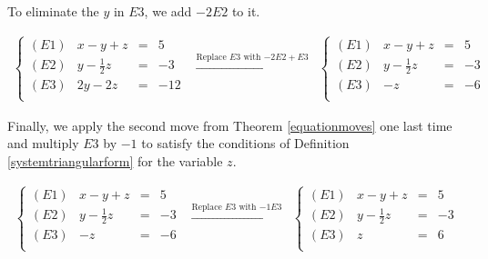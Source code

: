 \begin{ex}
\begin{enumerate}
To eliminate the $y$ in $E3$, we add $-2E2$ to it.

\[\begin{array}{ccc}

\left\{ 

\begin{array}{lrcr}

(E1) & x-y+z & = & 5 \\
(E2) & y - \frac{1}{2}z & = & -3\\
(E3) & 2y-2z & = & -12 \\

\end{array} 

\right.
&
\xrightarrow{\text{Replace $E3$ with $-2E2 + E3$}}

&

\left\{ 

\begin{array}{lrcr}

(E1) & x-y+z & = & 5 \\
(E2) & y - \frac{1}{2}z & = & -3\\
(E3) & -z & = & -6 \\

\end{array} 

\right.
\end{array}\]

Finally, we apply the second move from  Theorem \ref{equationmoves} one last time and multiply $E3$ by $-1$ to satisfy the conditions of Definition \ref{systemtriangularform} for the variable $z$.

\[\begin{array}{ccc}


\left\{ 

\begin{array}{lrcr}

(E1) & x-y+z & = & 5 \\
(E2) & y - \frac{1}{2}z & = & -3\\
(E3) & -z & = & -6 \\

\end{array} 

\right.

&
\xrightarrow{\text{Replace $E3$ with $-1E3$}}

&
\left\{ 

\begin{array}{lrcr}

(E1) & x-y+z & = & 5 \\
(E2) & y - \frac{1}{2}z & = & -3\\
(E3) & z & = & 6 \\


\end{array}
\end{array}\]
\end{enumerate}
\end{ex}
